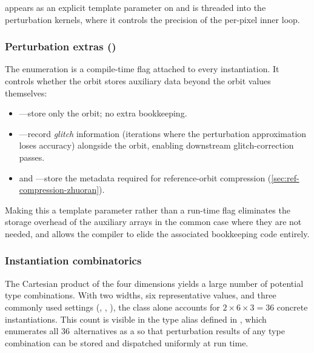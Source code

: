  appears as an explicit template parameter on
 and is threaded into the perturbation kernels, where it
controls the precision of the per-pixel inner loop.


\subsubsection{Perturbation extras ()}
\label{subsec:template-pextras}

The  enumeration is a compile-time flag attached to
every  instantiation.  It controls whether
the orbit stores auxiliary data beyond the orbit values themselves:

\begin{itemize}
  \item {}---store only the orbit; no extra bookkeeping.
  \item {}---record \emph{glitch} information (iterations where
        the perturbation approximation loses accuracy) alongside the
        orbit, enabling downstream glitch-correction passes.
  \item {} and ---store the
        metadata required for reference-orbit compression
        (\cref{sec:ref-compression-zhuoran}).
\end{itemize}

\noindent
Making this a template parameter rather than a run-time flag eliminates
the storage overhead of the auxiliary arrays in the common case where
they are not needed, and allows the compiler to elide the associated
bookkeeping code entirely.


\subsubsection{Instantiation combinatorics}
\label{subsec:template-combinatorics}

The Cartesian product of the four dimensions yields a large number of
potential type combinations.  With two  widths, six
representative  values, and three commonly used
 settings (, ,
), the  class
alone accounts for $2\times 6\times 3 = 36$ concrete instantiations.
This count is visible in the  type alias defined
in , which enumerates all 36~alternatives as a
 so that perturbation results of any type
combination can be stored and dispatched uniformly at run time.

